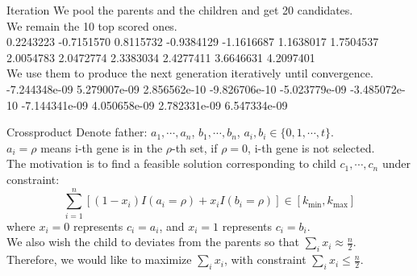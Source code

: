 \documentclass[xcolor=dvipsnames]{beamer}
\begin{document}
\begin{frame}{Iteration}
We pool the parents and the children and get 20 candidates.\\
We remain the 10 top scored ones.\\
0.2243223 -0.7151570  0.8115732 -0.9384129 -1.1616687  1.1638017  1.7504537  2.0054783  2.0472774  2.3383034 2.4277411  3.6646631  4.2097401\\
We use them to produce the next generation iteratively until convergence.\\
-7.244348e-09  5.279007e-09  2.856562e-10 -9.826706e-10 -5.023779e-09 -3.485072e-10 -7.144341e-09  4.050658e-09  2.782331e-09 6.547334e-09\\
\end{frame}
\begin{frame}{Crossproduct}
Denote father: $a_1,\cdots,a_n$, $b_1,\cdots,b_n$, $a_i,b_i\in\{0,1,\cdots,t\}$.\\
$a_i=\rho$ means i-th gene is in the $\rho$-th set, if $\rho=0$, i-th gene is not selected.\\
The motivation is to find a feasible solution corresponding to child $c_1,\cdots,c_n$ under constraint:\\
\[
\sum_{i=1}^n[(1-x_i)I(a_i=\rho)+x_iI(b_i=\rho)]\in[k_{\min},k_{\max}]
\]
where $x_i=0$ represents $c_i=a_i$, and $x_i=1$ represents $c_i=b_i$.\\
We also wish the child to deviates from the parents so that $\sum_ix_i\approx \frac{n}{2}$.\\
Therefore, we would like to maximize $\sum_ix_i$, with constraint $\sum_ix_i\leqslant \frac{n}{2}$.\\
\end{frame}
\end{document}
